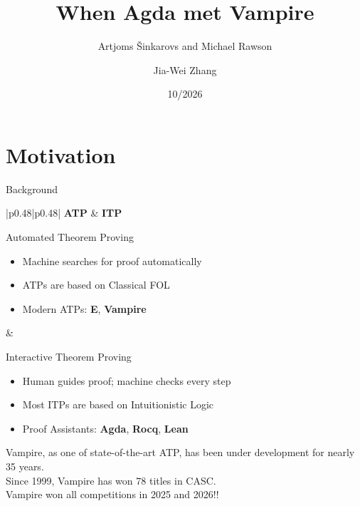\documentclass[aspectratio=43]{beamer}
\title{When Agda met Vampire}
\subtitle{Artjoms \v{S}inkarovs and Michael Rawson}
\author{Jia-Wei Zhang}
\date{10/2026}
\begin{document}
\begin{frame}[plain]
    \titlepage
\end{frame}


\section{Motivation}
\begin{frame}[t]{Background}
    \vspace{5pt}
    \centering
    \setlength{\tabcolsep}{4pt}%
    \begin{tabular}{|p{0.48\textwidth}|p{0.48\textwidth}|}
      \hline
      \centering\textbf{ATP} & \centering\textbf{ITP} \tabularnewline
      \hline
      \begin{minipage}[t]{\linewidth}\scriptsize\raggedright
        Automated Theorem Proving
        \begin{itemize}\setlength{\itemsep}{1pt}\setlength{\parskip}{0pt}
          \item Machine searches for proof automatically
          \item ATPs are based on Classical FOL
          \item Modern ATPs: \textbf{E}, \textbf{Vampire}
        \end{itemize}
      \end{minipage}
      &
      \begin{minipage}[t]{\linewidth}\scriptsize\raggedright
        Interactive Theorem Proving
        \begin{itemize}\setlength{\itemsep}{1pt}\setlength{\parskip}{0pt}
          \item Human guides proof; machine checks every step
          \item Most ITPs are based on Intuitionistic Logic
          \item Proof Assistants: \textbf{Agda}, \textbf{Rocq}, \textbf{Lean}
        \end{itemize}
      \end{minipage}
      \tabularnewline
      \hline
    \end{tabular}
    \vfill
    Vampire, as one of state-of-the-art ATP, has been under development for nearly 35 years. \\
    Since 1999, Vampire has won 78 titles in CASC.  \\
    Vampire won all competitions in 2025 and 2026!!
\end{frame}
\end{document}

